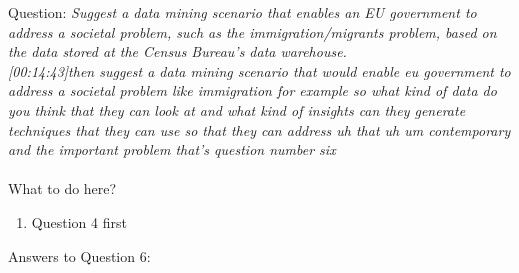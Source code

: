 Question:
\emph{
    Suggest a data mining scenario that enables an EU government to address a societal
problem, such as the immigration/migrants problem, based on the data stored at the
Census Bureau’s data warehouse.
}\\

\emph{[00:14:43]then suggest a data mining scenario that would enable eu government
to address a societal problem like immigration for example so what kind of data do you think
that they can look at and what kind of insights can they generate techniques that they can use
so that they can address uh that uh um contemporary and the important problem that's question number
six}\\\\

What to do here?
\begin{enumerate}
    \item Question 4 first
  \end{enumerate}

\newpage Answers to Question 6:

